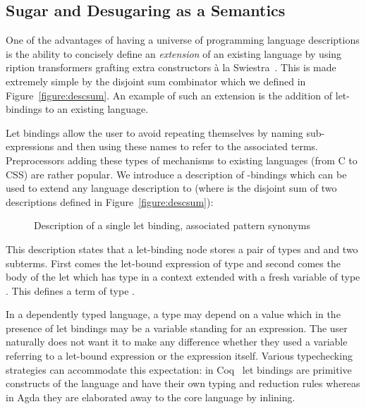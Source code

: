 \subsection{Sugar and Desugaring as a Semantics}\label{section:letbinding}

One of the advantages of having a universe of programming language
descriptions is the ability to concisely define an \emph{extension}
of an existing language by using ription transformers
grafting extra constructors à la Swiestra~\citeyear{swierstra_2008}.
This is made extremely simple by the disjoint sum combinator
 which we defined in Figure~\ref{figure:descsum}.
An example of such an extension is the addition of let-bindings to
an existing language.

Let bindings allow the user to avoid repeating themselves by naming
sub-expressions and then using these names to refer to the associated
terms. Preprocessors adding these types of mechanisms to existing
languages (from C to CSS) are rather popular. We introduce a
description of -bindings which can be used to extend any
language description  to    (where 
is the disjoint sum of two descriptions defined in Figure~\ref{figure:descsum}):

\begin{figure}[h]
\begin{minipage}{0.45\textwidth}
\end{minipage}
\begin{minipage}{0.45\textwidth}
\end{minipage}
\caption{Description of a single let binding, associated pattern synonyms\label{defn:letD}}
\end{figure}

This description states that a let-binding node stores a pair of types
\AB{$\sigma$} and \AB{$\tau$} and two subterms. First comes the let-bound
expression of type \AB{$\sigma$} and second comes the body of the let which
has type \AB{$\tau$} in a context extended with a fresh variable of type
\AB{$\sigma$}. This defines a term of type \AB{$\tau$}.

In a dependently typed language, a type may depend on a value which
in the presence of let bindings may be a variable standing for an
expression. The user naturally does not want it to make any difference
whether they used a variable referring to a let-bound expression or
the expression itself. Various typechecking strategies can accommodate
this expectation: in Coq~\cite{Coq:manual} let bindings are primitive
constructs of the language and have their own typing and reduction
rules whereas in Agda they are elaborated away to the core language
by inlining.

